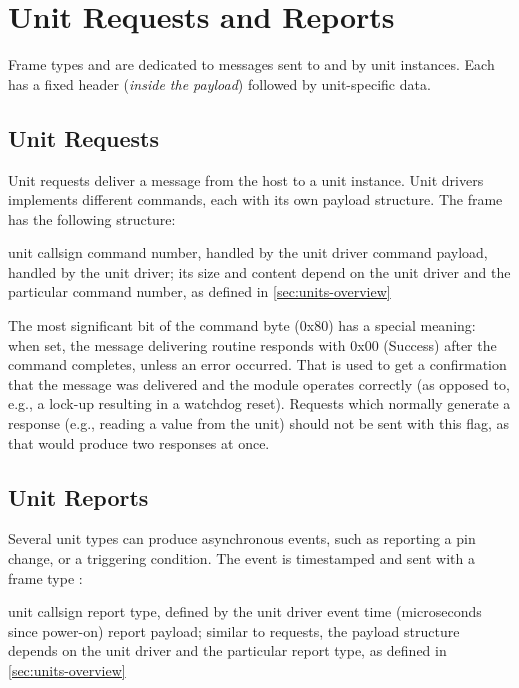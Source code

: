 \section{Unit Requests and Reports} \label{sec:unit_requests_reports}

Frame types \CmdUnitRequest and \CmdUnitReport are dedicated to messages sent to and by unit instances. Each has a fixed header (\textit{inside the payload}) followed by unit-specific data.

\subsection{Unit Requests}\label{sec:unit_requests_format}

Unit requests deliver a message from the host to a unit instance. Unit drivers implements different commands, each with its own payload structure. The frame \CmdUnitRequest has the following structure:

\begin{boxedpayload}
	 unit callsign
	 command number, handled by the unit driver
	 command payload, handled by the unit driver; its size and content depend on the unit driver and the particular command number, as defined in \cref{sec:units-overview}
\end{boxedpayload}

The most significant bit of the command byte (0x80) has a special meaning: when set, the message delivering routine responds with 0x00 (Success) after the command completes, unless an error occurred. That is used to get a confirmation that the message was delivered and the module operates correctly (as opposed to, e.g., a lock-up resulting in a watchdog reset). Requests which normally generate a response (e.g., reading a value from the unit) should not be sent with this flag, as that would produce two responses at once.

\subsection{Unit Reports}\label{sec:unit_reports_format}

Several unit types can produce asynchronous events, such as reporting a pin change, or a triggering condition. The event is timestamped and sent with a frame type \CmdUnitReport:

\begin{boxedpayload}
	 unit callsign
	 report type, defined by the unit driver
	 event time (microseconds since power-on)
	 report payload; similar to requests, the payload structure depends on the unit driver and the particular report type, as defined in \cref{sec:units-overview}
\end{boxedpayload}


















